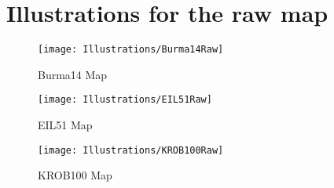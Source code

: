 \chapter{Illustrations for the raw map}
\label{chap:appendix1}

\begin{figure}[H]
	\caption{Burma14 Map}
	\texttt{[image: Illustrations/Burma14Raw]}
	\centering
	\label{fig:Burma14}
\end{figure}

\begin{figure}[H]
	\caption{EIL51 Map}
	\texttt{[image: Illustrations/EIL51Raw]}
	\centering
	\label{fig:EIL51}
\end{figure}

\begin{figure}[H]
	\caption{KROB100 Map}
	\texttt{[image: Illustrations/KROB100Raw]}
	\centering
	\label{fig:KROB100}
\end{figure}
